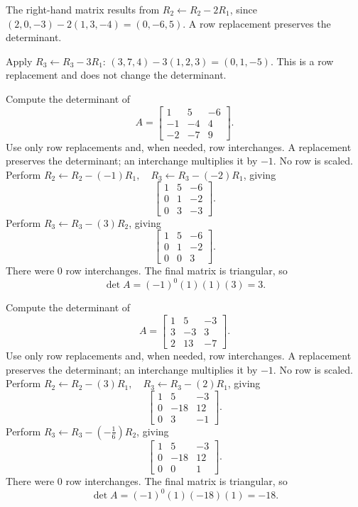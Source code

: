 The right-hand matrix results from $R_2\leftarrow R_2-2R_1$, since $(2,0,-3)-2(1,3,-4)=(0,-6,5)$. A row replacement preserves the determinant.

Apply $R_3\leftarrow R_3-3R_1$: $(3,7,4)-3(1,2,3)=(0,1,-5)$. This is a row replacement and does not change the determinant.

\goal Compute the determinant of
\[A=\begin{bmatrix}1&5&-6\\-1&-4&4\\-2&-7&9\end{bmatrix}.\]
Use only row replacements and, when needed, row interchanges. A replacement preserves the determinant; an interchange multiplies it by $-1$. No row is scaled.
Perform $R_2\leftarrow R_2-(-1)R_1,\quad R_3\leftarrow R_3-(-2)R_1$, giving
\[
\begin{bmatrix}1&5&-6\\0&1&-2\\0&3&-3\end{bmatrix}.
\]
Perform $R_3\leftarrow R_3-(3)R_2$, giving
\[
\begin{bmatrix}1&5&-6\\0&1&-2\\0&0&3\end{bmatrix}.
\]
There were $0$ row interchanges. The final matrix is triangular, so
\[\det A=(-1)^{0}(1)(1)(3)=3.\]


\goal Compute the determinant of
\[A=\begin{bmatrix}1&5&-3\\3&-3&3\\2&13&-7\end{bmatrix}.\]
Use only row replacements and, when needed, row interchanges. A replacement preserves the determinant; an interchange multiplies it by $-1$. No row is scaled.
Perform $R_2\leftarrow R_2-(3)R_1,\quad R_3\leftarrow R_3-(2)R_1$, giving
\[
\begin{bmatrix}1&5&-3\\0&-18&12\\0&3&-1\end{bmatrix}.
\]
Perform $R_3\leftarrow R_3-(- \frac{1}{6})R_2$, giving
\[
\begin{bmatrix}1&5&-3\\0&-18&12\\0&0&1\end{bmatrix}.
\]
There were $0$ row interchanges. The final matrix is triangular, so
\[\det A=(-1)^{0}(1)(-18)(1)=-18.\]


